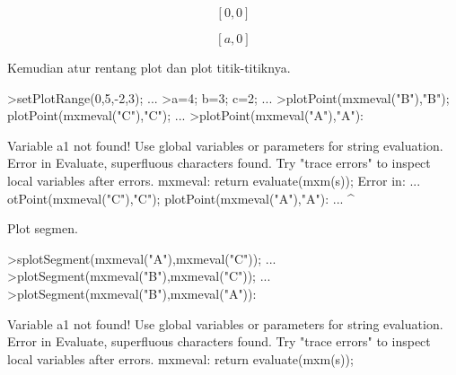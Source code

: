 \documentclass[a4paper,10pt]{article}
\begin{document}
\begin{eulernotebook}
\begin{eulercomment}
\begin{eulercomment}
\begin{eulercomment}
\begin{eulercomment}
\begin{eulercomment}
\begin{eulercomment}
\begin{eulercomment}
\begin{eulercomment}
\begin{eulercomment}
\begin{eulercomment}
\begin{eulercomment}
\begin{eulercomment}
\begin{eulercomment}
\begin{eulercomment}
\begin{eulercomment}
\begin{eulercomment}
\begin{eulercomment}
\begin{eulercomment}
\begin{eulercomment}
\begin{eulercomment}
\begin{eulercomment}
\begin{eulercomment}
\begin{eulercomment}
\begin{eulercomment}
\begin{eulercomment}
\begin{eulercomment}
\begin{eulercomment}
\begin{eulercomment}
\begin{eulercomment}
\begin{eulercomment}
\begin{eulercomment}
\begin{eulercomment}
\begin{eulercomment}
\begin{eulercomment}
\begin{eulercomment}
\begin{eulercomment}
\begin{eulercomment}
\begin{eulercomment}
\begin{eulercomment}
\begin{eulercomment}
\begin{eulercomment}
\begin{eulercomment}
\begin{eulercomment}
\begin{eulercomment}
\begin{eulercomment}
\begin{eulercomment}
\begin{eulercomment}
\begin{eulercomment}
\begin{eulercomment}
\begin{eulercomment}
\begin{eulercomment}
\begin{eulercomment}
\begin{eulercomment}
\begin{eulercomment}
\begin{eulercomment}
\begin{eulercomment}
\begin{eulercomment}
\begin{eulercomment}
\begin{eulercomment}
\begin{eulercomment}
\begin{eulercomment}
\begin{eulercomment}
\begin{eulerformula}
\[
\left[ 0 , 0 \right] 
\]
\end{eulerformula}
\begin{eulerformula}
\[
\left[ a , 0 \right] 
\]
\end{eulerformula}
\begin{eulercomment}
Kemudian atur rentang plot dan plot titik-titiknya.
\end{eulercomment}
\begin{eulerprompt}
>setPlotRange(0,5,-2,3); ...
>a=4; b=3; c=2; ...
>plotPoint(mxmeval("B"),"B"); plotPoint(mxmeval("C"),"C"); ...
>plotPoint(mxmeval("A"),"A"):
\end{eulerprompt}
\begin{euleroutput}
  Variable a1 not found!
  Use global variables or parameters for string evaluation.
  Error in Evaluate, superfluous characters found.
  Try "trace errors" to inspect local variables after errors.
  mxmeval:
      return evaluate(mxm(s));
  Error in:
  ... otPoint(mxmeval("C"),"C"); plotPoint(mxmeval("A"),"A"): ...
                                                       ^
\end{euleroutput}
\begin{eulercomment}
Plot segmen.
\end{eulercomment}
\begin{eulerprompt}
>splotSegment(mxmeval("A"),mxmeval("C")); ...
>plotSegment(mxmeval("B"),mxmeval("C")); ...
>plotSegment(mxmeval("B"),mxmeval("A")):
\end{eulerprompt}
\begin{euleroutput}
  Variable a1 not found!
  Use global variables or parameters for string evaluation.
  Error in Evaluate, superfluous characters found.
  Try "trace errors" to inspect local variables after errors.
  mxmeval:
      return evaluate(mxm(s));
  
\end{euleroutput}
\end{eulercomment}
\end{eulercomment}
\end{eulercomment}
\end{eulercomment}
\end{eulercomment}
\end{eulercomment}
\end{eulercomment}
\end{eulercomment}
\end{eulercomment}
\end{eulercomment}
\end{eulercomment}
\end{eulercomment}
\end{eulercomment}
\end{eulercomment}
\end{eulercomment}
\end{eulercomment}
\end{eulercomment}
\end{eulercomment}
\end{eulercomment}
\end{eulercomment}
\end{eulercomment}
\end{eulercomment}
\end{eulercomment}
\end{eulercomment}
\end{eulercomment}
\end{eulercomment}
\end{eulercomment}
\end{eulercomment}
\end{eulercomment}
\end{eulercomment}
\end{eulercomment}
\end{eulercomment}
\end{eulercomment}
\end{eulercomment}
\end{eulercomment}
\end{eulercomment}
\end{eulercomment}
\end{eulercomment}
\end{eulercomment}
\end{eulercomment}
\end{eulercomment}
\end{eulercomment}
\end{eulercomment}
\end{eulercomment}
\end{eulercomment}
\end{eulercomment}
\end{eulercomment}
\end{eulercomment}
\end{eulercomment}
\end{eulercomment}
\end{eulercomment}
\end{eulercomment}
\end{eulercomment}
\end{eulercomment}
\end{eulercomment}
\end{eulercomment}
\end{eulercomment}
\end{eulercomment}
\end{eulercomment}
\end{eulercomment}
\end{eulercomment}
\end{eulercomment}
\end{eulernotebook}
\end{document}
